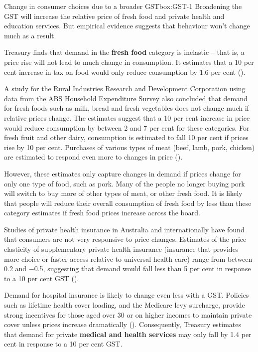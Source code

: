 \documentclass{grattanAlpha}
\begin{document}
\begin{bigboxC*}{Change in consumer choices due to a broader GST}{box:GST-1}
Broadening the GST will increase the relative price of fresh food and private health and education services. But empirical evidence suggests that behaviour won’t change much as a result. 

Treasury finds that demand in the \textbf{fresh food} category is inelastic – that is, a price rise will not lead to much change in consumption. It estimates that a 10 per cent increase in tax on food would only reduce consumption by 1.6 per cent (\textcite{Treasury2015TES2014}).

A study for the Rural Industries Research and Development Corporation using data from the ABS Household Expenditure Survey also concluded that demand for fresh foods such as milk, bread and fresh vegetables does not change much if relative prices change. The estimates suggest that a 10 per cent increase in price would reduce consumption by between 2 and 7 per cent for these categories. For fresh fruit and other dairy, consumption is estimated to fall 10 per cent if prices rise by 10 per cent. Purchases of various types of meat (beef, lamb, pork, chicken) are estimated to respond even more to changes in price (\textcite{UlubasogluMallickWadudEtAl2015}). 

However, these estimates only capture changes in demand if prices change for only one type of food, such as pork. Many of the people no longer buying pork will switch to buy more of other types of meat, or other fresh food. It is likely that people will reduce their overall consumption of fresh food by less than these category estimates if fresh food prices increase across the board. 

Studies of private health insurance in Australia and internationally have found that consumers are not very responsive to price changes. Estimates of the price elasticity of supplementary private health insurance (insurance that provides more choice or faster access relative to universal health care) range from between 0.2 and $-$0.5, suggesting that demand would fall less than 5 per cent in response to a 10 per cent GST (\textcite{Cheng2013-health-insurance-elasticity}). 

Demand for hospital insurance is likely to change even less with a GST. Policies such as lifetime health cover loading, and the Medicare levy surcharge, provide strong incentives for those aged over 30 or on higher incomes to maintain private cover unless prices increase dramatically (\textcite{ATO2015-Private-Health-Insurance-rebate-Medicare-levy-surcharge}). 
Consequently, Treasury estimates that demand for private \textbf{medical and health services} may only fall by 1.4 per cent in response to a 10 per cent GST. 


\end{bigboxC*}
\end{document}
